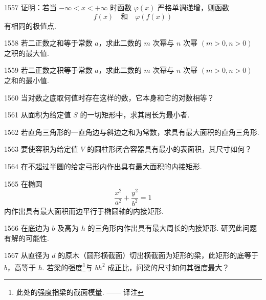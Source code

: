 \begin{prob}[M]{1557}
证明：若当 $-\infty < x < +\infty$ 时函数 $\varphi(x)$ 严格单调递增，则函数
\[
f(x) \quad \text{和} \quad \varphi(f(x))
\]
有相同的极值点.
\end{prob}

\begin{prob}[M]{1558}
若二正数之和等于常数 $a$，求此二数的 $m$ 次幂与 $n$ 次幂 $(m > 0, n > 0)$ 之积的最大值.
\end{prob}

\begin{prob}[M]{1559}
若二正数之积等于常数 $a$，求此二数的 $m$ 次幂与 $n$ 次幂 $(m > 0, n > 0)$ 之和的最小值.
\end{prob}

\begin{prob}[M]{1560}
当对数之底取何值时存在这样的数，它本身和它的对数相等？
\end{prob}

\begin{prob}[M]{1561}
从面积为给定值 $S$ 的一切矩形中，求其周长为最小者.
\end{prob}

\begin{prob}[M]{1562}
若直角三角形的一直角边与斜边之和为常数，求具有最大面积的直角三角形.
\end{prob}

\begin{prob}[M]{1563}
要使容积为给定值 $V$ 的圆柱形闭合容器具有最小的表面积，其尺寸如何？
\end{prob}

\begin{prob}[M]{1564}
在不超过半圆的给定弓形内作出具有最大面积的内接矩形.
\end{prob}

\begin{prob}[M]{1565}
在椭圆
\[
\frac{x^2}{a^2} + \frac{y^2}{b^2} = 1
\]
内作出具有最大面积而边平行于椭圆轴的内接矩形.
\end{prob}

\begin{prob}[M]{1566}
在底边为 $b$ 及高为 $h$ 的三角形内作出具有最大周长的内接矩形. 研究此问题有解的可能性.
\end{prob}

\begin{prob}[M]{1567}
从直径为 $d$ 的原木（圆形横截面）切出横截面为矩形的梁，此矩形的底等于 $b$，高等于 $h$. 若梁的强度\footnote{此处的强度指梁的截面模量. —— 译注}与 $bh^2$ 成正比，问梁的尺寸如何其强度最大？
\end{prob}

